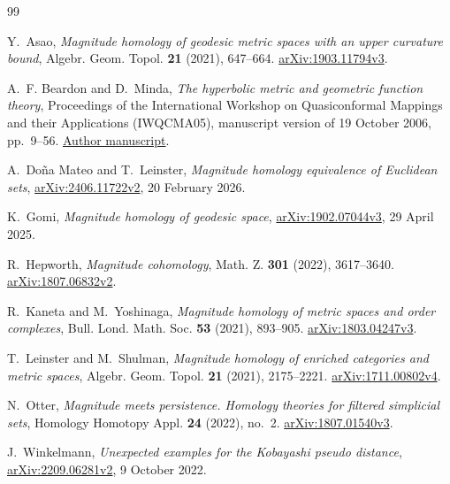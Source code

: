 \documentclass[12pt]{amsart}
\theoremstyle{definition}
\theoremstyle{remark}
\numberwithin{equation}{section}
\begin{document}
\begin{thebibliography}{99}
\raggedright
{}
Y.~Asao, \emph{Magnitude homology of geodesic metric spaces with an upper curvature bound}, Algebr. Geom. Topol. \textbf{21} (2021), 647--664.
\href{https://arxiv.org/abs/1903.11794v3}{arXiv:1903.11794v3}.

A.~F. Beardon and D.~Minda, \emph{The hyperbolic metric and geometric function theory}, Proceedings of the International Workshop on Quasiconformal Mappings and their Applications (IWQCMA05), manuscript version of 19 October 2006, pp.~9--56.
\href{https://www.math.stonybrook.edu/~bishop/classes/math401.F09/Beardon-Minda.pdf}{Author manuscript}.

A.~Do\~na Mateo and T.~Leinster, \emph{Magnitude homology equivalence of Euclidean sets},
\href{https://arxiv.org/abs/2406.11722v2}{arXiv:2406.11722v2}, 20 February 2026.

K.~Gomi, \emph{Magnitude homology of geodesic space},
\href{https://arxiv.org/abs/1902.07044v3}{arXiv:1902.07044v3}, 29 April 2025.

R.~Hepworth, \emph{Magnitude cohomology}, Math. Z. \textbf{301} (2022), 3617--3640.
\href{https://arxiv.org/abs/1807.06832v2}{arXiv:1807.06832v2}.

R.~Kaneta and M.~Yoshinaga, \emph{Magnitude homology of metric spaces and order complexes}, Bull. Lond. Math. Soc. \textbf{53} (2021), 893--905.
\href{https://arxiv.org/abs/1803.04247v3}{arXiv:1803.04247v3}.

T.~Leinster and M.~Shulman, \emph{Magnitude homology of enriched categories and metric spaces}, Algebr. Geom. Topol. \textbf{21} (2021), 2175--2221.
\href{https://arxiv.org/abs/1711.00802v4}{arXiv:1711.00802v4}.

N.~Otter, \emph{Magnitude meets persistence. Homology theories for filtered simplicial sets}, Homology Homotopy Appl. \textbf{24} (2022), no.~2.
\href{https://arxiv.org/abs/1807.01540v3}{arXiv:1807.01540v3}.

J.~Winkelmann, \emph{Unexpected examples for the Kobayashi pseudo distance},
\href{https://arxiv.org/abs/2209.06281v2}{arXiv:2209.06281v2}, 9 October 2022.
\end{thebibliography}

\par
\clearpage
\endgroup
\end{document}

